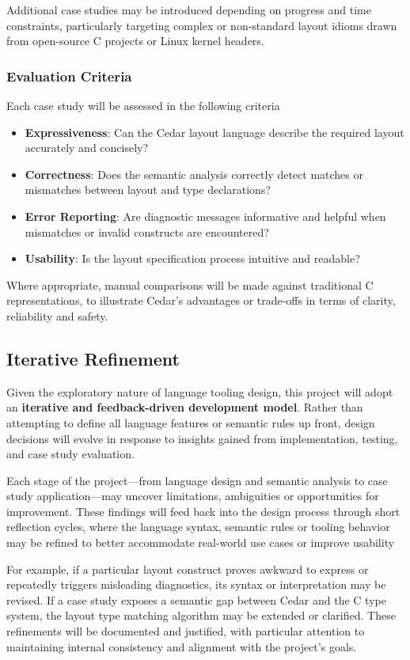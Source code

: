 \documentclass[12pt]{article}
\begin{document}
Additional case studies may be introduced depending on progress and time
constraints, particularly targeting complex or non-standard layout idioms
drawn from open-source C projects or Linux kernel headers.

\subsubsection{Evaluation Criteria}
Each case study will be assessed in the following criteria

\begin{itemize}
    \item \textbf{Expressiveness}: Can the Cedar layout language describe the
    required layout accurately and concisely?
    \item \textbf{Correctness}: Does the semantic analysis correctly detect
    matches or mismatches between layout and type declarations?
    \item \textbf{Error Reporting}: Are diagnostic messages informative and
    helpful when mismatches or invalid constructs are encountered?
    \item \textbf{Usability}: Is the layout specification process intuitive and
    readable?
\end{itemize}

Where appropriate, manual comparisons will be made against traditional C
representations, to illustrate Cedar's advantages or trade-offs in terms of
clarity, reliability and safety.

\subsection{Iterative Refinement}
Given the exploratory nature of language tooling design, this project will
adopt an \textbf{iterative and feedback-driven development model}. Rather than
attempting to define all language features or semantic rules up front, design
decisions will evolve in response to insights gained from implementation,
testing, and case study evaluation.

Each stage of the project---from language design and semantic analysis to
case study application---may uncover limitations, ambiguities or opportunities
for improvement. These findings will feed back into the design process through
short reflection cycles, where the language syntax, semantic rules or
tooling behavior may be refined to better accommodate real-world use cases or
improve usability

For example, if a particular layout construct proves awkward to express or
repeatedly triggers misleading diagnostics, its syntax or interpretation may be
revised. If a case study exposes a semantic gap between Cedar and the C type
system, the layout type matching algorithm may be extended or clarified.
These refinements will be documented and justified, with particular attention to
maintaining internal consistency and alignment with the project's goals.
\end{document}
